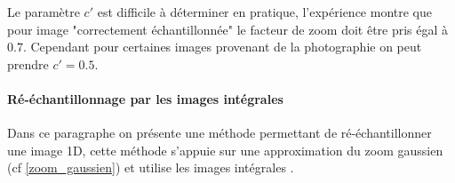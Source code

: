 Le paramètre $c'$ est difficile à déterminer en pratique, l'expérience montre que pour image "correctement échantillonnée" le facteur de zoom doit être pris égal à $0.7$. Cependant pour certaines images provenant de la photographie on peut prendre $c'=0.5$.\\

\paragraph{Ré-échantillonnage par les images intégrales }
\label{4Integral}
Dans ce paragraphe on présente une méthode permettant de ré-échantillonner une image 1D, cette méthode s'appuie sur une approximation du zoom gaussien (cf \ref{zoom_gaussien}) et utilise les images intégrales .\\



